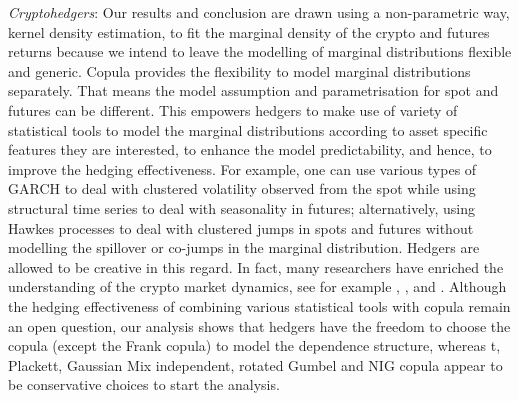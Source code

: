\textit{Cryptohedgers}: Our results and conclusion are drawn using a non-parametric way, kernel density estimation,
to fit the marginal density of the crypto and futures returns because we intend to leave the modelling of marginal distributions flexible and generic.
Copula provides the flexibility to model marginal distributions separately.
That means the model assumption and parametrisation for spot and futures can be different.
This empowers hedgers to make use of variety of statistical tools to model the marginal distributions according to asset specific features they are interested,
to enhance the model predictability, and hence, to improve the hedging effectiveness.
For example, one can use various types of GARCH to deal with clustered volatility observed from the spot while using structural time series to deal with seasonality in futures;
alternatively, using Hawkes processes to deal with clustered jumps in spots and futures without modelling the spillover or co-jumps in the marginal distribution.
Hedgers are allowed to be creative in this regard. In fact, many researchers have enriched the understanding of the crypto market dynamics,
see for example \citet{kaiser2019seasonality}, \citet{gyamerah2022modelling}, and \citet{mark2022quantifying}.
Although the hedging effectiveness of combining various statistical tools with copula remain an open question,
our analysis shows that hedgers have the freedom to choose the copula (except the Frank copula) to model the dependence structure,
whereas t, Plackett, Gaussian Mix independent, rotated Gumbel and NIG copula appear to be conservative choices to start the analysis.

